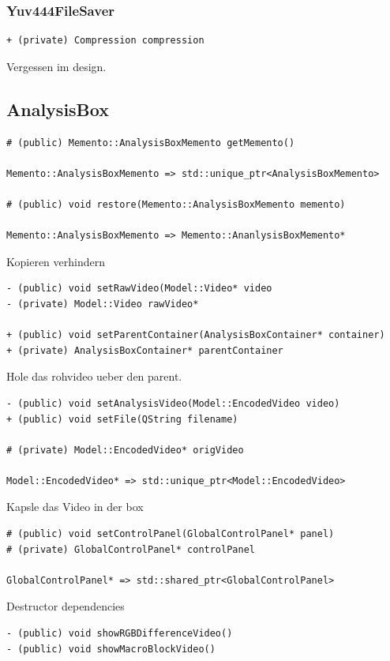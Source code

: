 \documentclass{scrartcl}
\begin{document}
{\subsubsection{Yuv444FileSaver}
\begin{verbatim}
+ (private) Compression compression
\end{verbatim}
Vergessen im design.
\subsection{AnalysisBox}
\begin{verbatim}
# (public) Memento::AnalysisBoxMemento getMemento()

Memento::AnalysisBoxMemento => std::unique_ptr<AnalysisBoxMemento>

# (public) void restore(Memento::AnalysisBoxMemento memento)

Memento::AnalysisBoxMemento => Memento::AnanlysisBoxMemento*
\end{verbatim}
Kopieren verhindern

\begin{verbatim}
- (public) void setRawVideo(Model::Video* video
- (private) Model::Video rawVideo*

+ (public) void setParentContainer(AnalysisBoxContainer* container)
+ (private) AnalysisBoxContainer* parentContainer
\end{verbatim}
Hole das rohvideo ueber den parent.

\begin{verbatim}
- (public) void setAnalysisVideo(Model::EncodedVideo video)
+ (public) void setFile(QString filename)

# (private) Model::EncodedVideo* origVideo

Model::EncodedVideo* => std::unique_ptr<Model::EncodedVideo>
\end{verbatim}
Kapsle das Video in der box
\begin{verbatim}
# (public) void setControlPanel(GlobalControlPanel* panel)
# (private) GlobalControlPanel* controlPanel

GlobalControlPanel* => std::shared_ptr<GlobalControlPanel>
\end{verbatim}
Destructor dependencies

\begin{verbatim}
- (public) void showRGBDifferenceVideo()
- (public) void showMacroBlockVideo()


\end{verbatim}}
\end{document}
